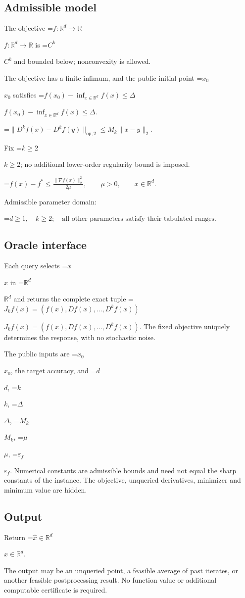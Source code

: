 \documentclass[10pt,a4paper]{article}
\newcommand{\AtlasMath}[1]{\par\begingroup\centering\setbox0=\hbox{$\displaystyle #1$}\ifdim\wd0>1.4\linewidth\typeout{ATLAS WIDE FORMULA: \the\wd0}\fi\ifdim\wd0>\linewidth\resizebox{\linewidth}{!}{\box0}\else\box0\fi\par\endgroup}
\newcommand{\AtlasInlineMath}[1]{\begingroup\setbox0=\hbox{$#1$}\ifdim\wd0>.4\linewidth\endgroup\AtlasMath{#1}\else\endgroup$#1$\fi}
\begin{document}
\subsection{Admissible model}
The objective \AtlasInlineMath{f:\mathbb{R}^d\to\mathbb{R}} is \AtlasInlineMath{C^k} and bounded below; nonconvexity is allowed.

The objective has a finite infimum, and the public initial point \AtlasInlineMath{x_0} satisfies \AtlasInlineMath{f(x_0)-\inf_{x\in \mathbb{R}^d}f(x)\le\Delta}.


\AtlasMath{\|D^{k}f(x)-D^{k}f(y)\|_{\mathrm{op},2}\le M_k\|x-y\|_{2}.}


Fix \AtlasInlineMath{k\ge2}; no additional lower-order regularity bound is imposed.


\AtlasMath{f(x)-f^*\le\frac{\|\nabla f(x)\|_2^2}{2\mu},\qquad\mu>0,\qquad x\in\mathbb{R}^d.}


Admissible parameter domain:


\AtlasMath{d\ge1,\quad k\ge2;\quad\text{all other parameters satisfy their tabulated ranges}.}


\subsection{Oracle interface}
Each query selects \AtlasInlineMath{x} in \AtlasInlineMath{\mathbb{R}^d} and returns the complete exact tuple \AtlasInlineMath{J_{k}f(x)=(f(x),Df(x),\ldots,D^{k}f(x))}. The fixed objective uniquely determines the response, with no stochastic noise.

The public inputs are \AtlasInlineMath{x_0}, the target accuracy, and \AtlasInlineMath{d}, \AtlasInlineMath{k}, \AtlasInlineMath{\Delta}, \AtlasInlineMath{M_k}, \AtlasInlineMath{\mu}, \AtlasInlineMath{\varepsilon_f}. Numerical constants are admissible bounds and need not equal the sharp constants of the instance. The objective, unqueried derivatives, minimizer and minimum value are hidden.

\subsection{Output}
Return \AtlasInlineMath{\widehat{x}\in \mathbb{R}^d}.

The output may be an unqueried point, a feasible average of past iterates, or another feasible postprocessing result. No function value or additional computable certificate is required.
\end{document}

